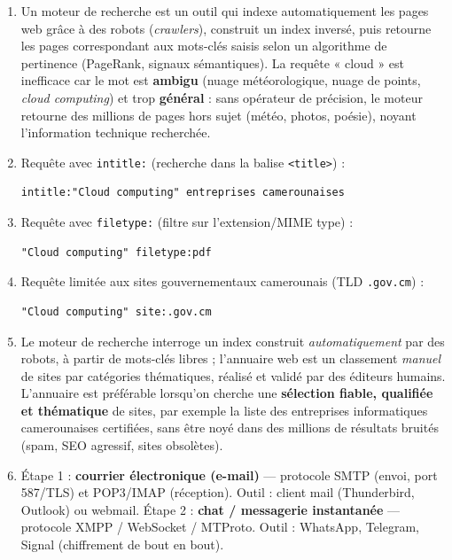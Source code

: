 \documentclass[11pt]{article}
\begin{document}
\begin{corrige}
\begin{enumerate}
    \item Un moteur de recherche est un outil qui indexe automatiquement les pages web grâce à des robots (\emph{crawlers}), construit un index inversé, puis retourne les pages correspondant aux mots-clés saisis selon un algorithme de pertinence (PageRank, signaux sémantiques). La requête « cloud » est inefficace car le mot est \textbf{ambigu} (nuage météorologique, nuage de points, \emph{cloud computing}) et trop \textbf{général} : sans opérateur de précision, le moteur retourne des millions de pages hors sujet (météo, photos, poésie), noyant l'information technique recherchée.
    \item Requête avec \texttt{intitle:} (recherche dans la balise \texttt{<title>}) :
\begin{lstlisting}
intitle:"Cloud computing" entreprises camerounaises
\end{lstlisting}
    \item Requête avec \texttt{filetype:} (filtre sur l'extension/MIME type) :
\begin{lstlisting}
"Cloud computing" filetype:pdf
\end{lstlisting}
    \item Requête limitée aux sites gouvernementaux camerounais (TLD \texttt{.gov.cm}) :
\begin{lstlisting}
"Cloud computing" site:.gov.cm
\end{lstlisting}
    \item Le moteur de recherche interroge un index construit \emph{automatiquement} par des robots, à partir de mots-clés libres ; l'annuaire web est un classement \emph{manuel} de sites par catégories thématiques, réalisé et validé par des éditeurs humains. L'annuaire est préférable lorsqu'on cherche une \textbf{sélection fiable, qualifiée et thématique} de sites, par exemple la liste des entreprises informatiques camerounaises certifiées, sans être noyé dans des millions de résultats bruités (spam, SEO agressif, sites obsolètes).
    \item Étape 1 : \textbf{courrier électronique (e-mail)} — protocole SMTP (envoi, port 587/TLS) et POP3/IMAP (réception). Outil : client mail (Thunderbird, Outlook) ou webmail. \newline
    Étape 2 : \textbf{chat / messagerie instantanée} — protocole XMPP / WebSocket / MTProto. Outil : WhatsApp, Telegram, Signal (chiffrement de bout en bout). \newline

\end{enumerate}
\end{corrige}
\end{document}
